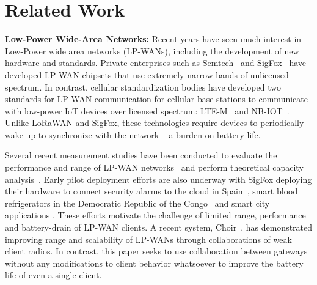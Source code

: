 \section{Related Work}
\label{sec:related-work}



\noindent \textbf{Low-Power Wide-Area Networks: } Recent years have seen much
interest in Low-Power wide area networks (LP-WANs), including the development
of new hardware and standards. Private enterprises such as
Semtech~\cite{LoRaWanAlliance2015} and SigFox~\cite{sanchez2016state} have
developed LP-WAN chipsets that use extremely narrow bands of unlicensed
spectrum. In contrast, cellular standardization bodies have developed two
standards for LP-WAN communication for cellular base stations to communicate
with low-power IoT devices over licensed spectrum:
LTE-M~\cite{GSMAssociation2016} and NB-IOT~\cite{ratasuk2016nb}. Unlike LoRaWAN
and SigFox, these technologies require devices to periodically wake up to
synchronize with the network -- a burden on battery life.

Several recent measurement studies have been conducted to evaluate the
performance and range of LP-WAN networks~\cite{petric2016measurements,
toldov2016performance} and perform theoretical capacity
analysis~\cite{mikhaylov2016analysis}. Early pilot deployment efforts are also
underway with SigFox deploying their hardware to connect security alarms to
the cloud in Spain~\cite{sanchez2016state}, smart blood refrigerators in the
Democratic Republic of the Congo~\cite{ramachandranmupnp} and smart city
applications \cite{centenaro2015long}. These efforts motivate the challenge of
limited range, performance and battery-drain of LP-WAN clients. A recent
system, Choir~\cite{eletreby2017empowering},  has demonstrated improving range
and scalability of LP-WANs through collaborations of weak client radios. In
contrast, this paper seeks to use collaboration between gateways without any
modifications to client behavior whatsoever to improve the battery life of
even a single client.

